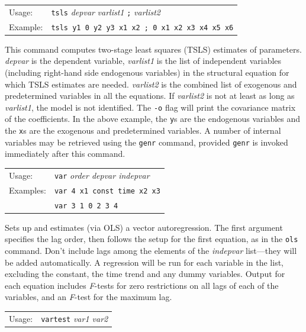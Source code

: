 \documentclass{article}
\begin{document}
{

\begin{tabular}{ll}
Usage: & \texttt{tsls} \textit{depvar} \textit{varlist1} \texttt{;}
          \textit{varlist2} \\
Example: & \texttt{tsls y1 0 y2 y3 x1 x2 ; 0 x1 x2 x3 x4 x5 x6}
\end{tabular}

This command computes two-stage least squares (TSLS) estimates of
parameters.  \textit{depvar} is the dependent variable,
\textit{varlist1} is the list of independent variables (including
right-hand side endogenous variables) in the structural equation for
which TSLS estimates are needed.  \textit{varlist2} is the combined
list of exogenous and predetermined variables in all the equations.
If \textit{varlist2} is not at least as long as \textit{varlist1}, the
model is not identified.  The \texttt{-o} flag will print the
covariance matrix of the coefficients.  In the above example, the
\texttt{y}s are the endogenous variables and the \texttt{x}s are the
exogenous and predetermined variables.  A number of internal variables
may be retrieved using the \texttt{genr} command, provided
\texttt{genr} is invoked immediately after this command.


\begin{tabular}{ll}
Usage: &         \texttt{var} \textit{order depvar indepvar}\\
Examples: &      \texttt{var 4 x1 const time x2 x3}\\
          &      \texttt{var 3 1 0 2 3 4}
\end{tabular}

Sets up and estimates (via OLS) a vector autoregression.  The first
argument specifies the lag order, then follows the setup for the first
equation, as in the \texttt{ols} command.  Don't include lags among
the elements of the \textit{indepvar} list---they will be added
automatically. A regression will be run for each variable in the list,
excluding the constant, the time trend and any dummy variables.
Output for each equation includes \textit{F}-tests for zero
restrictions on all lags of each of the variables, and an
\textit{F}-test for the maximum lag.


\begin{tabular}{ll}
Usage:    &      \texttt{vartest} \textit{var1 var2}
\end{tabular}

}
\end{document}
